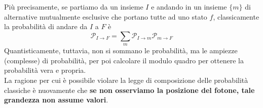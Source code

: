 \documentclass[FisicaTeorica.tex]{subfiles}
\begin{document}
Più precisamente, se partiamo da un insieme $I$ e andando in un insieme $\{m\}$ di alternative mutualmente esclusive che portano tutte ad uno stato $f$, classicamente la probabilità di andare da $I$ a $F$ è \[
\mathcal{P}_{I\to F} = \sum_m \mathcal{P}_{I\to m}\mathcal{P}_{m\to F}
\]
Quantisticamente, tuttavia, non si sommano le probabilità, ma le ampiezze (complesse) di probabilità, per poi calcolare il modulo quadro per ottenere la probabilità vera e propria.\\ 
La ragione per cui è possibile violare la legge di composizione delle probabilità classiche è nuovamente che \textbf{se non osserviamo la posizione del fotone, tale grandezza non assume valori}. 
\end{document}
